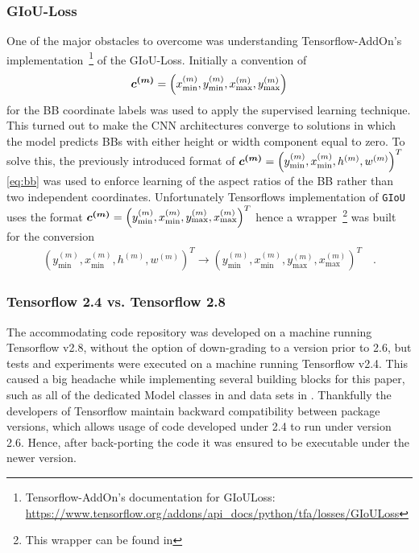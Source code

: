 \subsubsection{GIoU-Loss}
One of the major obstacles to overcome was understanding Tensorflow-AddOn's implementation~\footnote{Tensorflow-AddOn's documentation for GIoULoss: \url{https://www.tensorflow.org/addons/api_docs/python/tfa/losses/GIoULoss}} of the GIoU-Loss.
Initially a convention of
\begin{align*}
    \bm{c^{(m)}} = \left(x^{(m)}_{\min}, y^{(m)}_{\min}, x^{(m)}_{\max}, y^{(m)}_{\max}\right)
\end{align*}
for the BB coordinate labels was used to apply the supervised learning technique.
This turned out to make the CNN architectures converge to solutions in which the model predicts BBs with either height or width component equal to zero.
To solve this, the previously introduced format of $\bm{c^{(m)}} = \left(y^{(m)}_{\min}, x^{(m)}_{\min}, h^{(m)}, w^{(m)}\right)^T$\eqref{eq:bb} was used to enforce learning of the aspect ratios of the BB rather than two independent coordinates.
Unfortunately Tensorflows implementation of \lstinline{GIoU} uses the format $\bm{c^{(m)}} = \left(y^{(m)}_{\min}, x^{(m)}_{\min}, y^{(m)}_{\max}, x^{(m)}_{\max}\right)^T$ hence a wrapper~\footnote{This wrapper can be found in } was built for the conversion
\begin{align*}
    \left(y^{(m)}_{\min}, x^{(m)}_{\min}, h^{(m)}, w^{(m)}\right)^T \rightarrow \left(y^{(m)}_{\min}, x^{(m)}_{\min}, y^{(m)}_{\max}, x^{(m)}_{\max}\right)^T\quad .
\end{align*}
\subsubsection{Tensorflow 2.4 vs. Tensorflow 2.8}
The accommodating code repository was developed on a machine running Tensorflow v2.8, without the option of down-grading to a version prior to 2.6, but tests and experiments were executed on a machine running Tensorflow v2.4.
This caused a big headache while implementing several building blocks for this paper, such as all of the dedicated Model classes in  and data sets in .
Thankfully the developers of Tensorflow maintain backward compatibility between package versions, which allows usage of code developed under 2.4 to run under version 2.6.
Hence, after back-porting the code it was ensured to be executable under the newer version.
